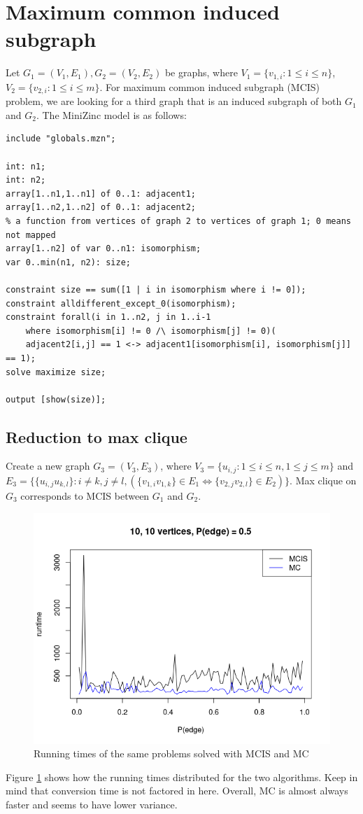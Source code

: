\documentclass{article}
\begin{document}
\section{Maximum common induced subgraph}
Let $G_1 = (V_1, E_1), G_2 = (V_2, E_2) $ be graphs, where $ V_1 = \{v_{1,i}: 1 \le i \le n\}$, $ V_2 = \{v_{2,i}: 1 \le i \le m\}$. For maximum common induced subgraph (MCIS) problem, we are looking for a third graph that is an induced subgraph of both $G_1$ and $G_2$. The MiniZinc model is as follows:
\begin{lstlisting}
include "globals.mzn";

int: n1;
int: n2;
array[1..n1,1..n1] of 0..1: adjacent1;
array[1..n2,1..n2] of 0..1: adjacent2;
% a function from vertices of graph 2 to vertices of graph 1; 0 means not mapped
array[1..n2] of var 0..n1: isomorphism;
var 0..min(n1, n2): size;

constraint size == sum([1 | i in isomorphism where i != 0]);
constraint alldifferent_except_0(isomorphism);
constraint forall(i in 1..n2, j in 1..i-1
    where isomorphism[i] != 0 /\ isomorphism[j] != 0)(
    adjacent2[i,j] == 1 <-> adjacent1[isomorphism[i], isomorphism[j]] == 1);
solve maximize size;

output [show(size)];
\end{lstlisting}
\subsection{Reduction to max clique}
Create a new graph $G_3 = (V_3, E_3)$, where $V_3 = \{u_{i,j}: 1 \le i \le n, 1 \le j \le m\}$ and $E_3 = \{\{u_{i,j}u_{k,l}\}: i \ne k, j \ne l, (\{v_{1,i}v_{1,k}\} \in E_1 \iff \{v_{2,j}v_{2,l}\} \in E_2)\}$. Max clique on $G_3$ corresponds to MCIS between $G_1$ and $G_2$. 
\begin{figure}
  \includegraphics[scale=0.5]{conversion.png}
  \caption{Running times of the same problems solved with MCIS and MC}
  \label{fig:conversion}
\end{figure}
Figure \ref{fig:conversion} shows how the running times distributed for the two algorithms. Keep in mind that conversion time is not factored in here. Overall, MC is almost always faster and seems to have lower variance.
\end{document}
